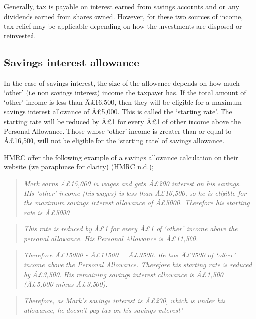 \documentclass[]{tufte-handout}
\begin{document}
Generally, tax is payable on interest earned from savings accounts and
on any dividends earned from shares owned. However, for these two
sources of income, tax relief may be applicable depending on how the
investments are disposed or reinvested.

\hypertarget{savings-interest-allowance}{%
\subsection{Savings interest
allowance}\label{savings-interest-allowance}}

In the case of savings interest, the size of the allowance depends on
how much `other' (i.e non savings interest) income the taxpayer has. If
the total amount of `other' income is less than Â£16,500, then they will
be eligible for a maximum savings interest allowance of Â£5,000. This is
called the `starting rate'. The starting rate will be reduced by Â£1 for
every Â£1 of other income above the Personal Allowance. Those whose
`other' income is greater than or equal to Â£16,500, will not be
eligible for the `starting rate' of savings allowance.

HMRC offer the following example of a savings allowance calculation on
their website (we paraphrase for clarity) (HMRC
\protect\hyperlink{ref-HMRC}{n.d.});

\begin{quote}
\emph{Mark earns Â£15,000 in wages and gets Â£200 interest on his
savings. HIs `other' income (his wages) is less than Â£16,500, so he is
eligible for the maximum savings interest allowance of Â£5000. Therefore
his starting rate is Â£5000}
\end{quote}

\begin{quote}
\emph{This rate is reduced by Â£1 for every Â£1 of `other' income above
the personal allowance.} \emph{His Personal Allowance is Â£11,500.}
\end{quote}

\begin{quote}
\emph{Therefore Â£15000 - Â£11500 = Â£3500. He has Â£3500 of `other'
income above the Personal Allowance. Therefore his starting rate is
reduced by Â£3,500. His remaining savings interest allowance is Â£1,500
(Â£5,000 minus Â£3,500).}
\end{quote}

\begin{quote}
\emph{Therefore, as Mark's savings interest is Â£200, which is under his
allowance, he doesn't pay tax on his savings interest"}
\end{quote}
\end{document}

